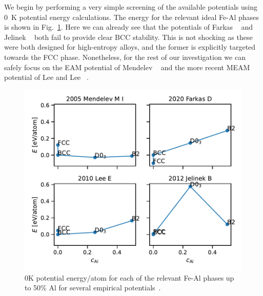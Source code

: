 We begin by performing a very simple screening of the available potentials using 0~K potential energy calculations.
The energy for the relevant ideal Fe-Al phases is shown in Fig.~\ref{fig:0K_phases}.
Here we can already see that the potentials of Farkas \etal~\cite{farkas2020model} and Jelinek \etal~\cite{jelinek2012modified} both fail to provide clear BCC stability.
This is not shocking as these were both designed for high-entropy alloys, and the former is explicitly targeted towards the FCC phase.
Nonetheless, for the rest of our investigation we can safely focus on the EAM potential of Mendelev \etal~\cite{mendelev2005effect} and the more recent MEAM potential of Lee and Lee \etal~\cite{lee2010modified}.
%
\begin{figure}[h]
    \centering
    \includegraphics[width=\textwidth]{figures/zerok_phases}
    \caption{0K potential energy/atom for each of the relevant Fe-Al phases up to 50\% Al for several empirical potentials~\cite{mendelev2005effect, lee2010modified, jelinek2012modified, farkas2020model}.}
    \label{fig:0K_phases}
\end{figure}

